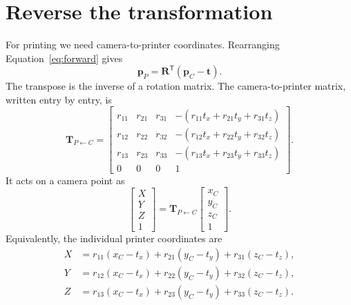\documentclass[11pt,letterpaper]{article}
\newcommand{\p}{\mathbf p}
\newcommand{\R}{\mathbf R}
\newcommand{\T}{\mathbf T}
\newcommand{\tr}{\mathbf t}
\newcommand{\tp}{\mathsf T}
\begin{document}
\section{Reverse the transformation}
For printing we need camera-to-printer coordinates. Rearranging
Equation~\eqref{eq:forward} gives
\begin{equation}
 \boxed{\p_P=\R^\tp(\p_C-\tr).}
 \label{eq:inverse}
\end{equation}
The transpose is the inverse of a rotation matrix. The camera-to-printer
matrix, written entry by entry, is
\begin{equation}
 \boxed{\T_{P\leftarrow C}=
 \begin{bmatrix}
 r_{11}&r_{21}&r_{31}&-(r_{11}t_x+r_{21}t_y+r_{31}t_z)\\
 r_{12}&r_{22}&r_{32}&-(r_{12}t_x+r_{22}t_y+r_{32}t_z)\\
 r_{13}&r_{23}&r_{33}&-(r_{13}t_x+r_{23}t_y+r_{33}t_z)\\
 0&0&0&1
 \end{bmatrix}.}
 \label{eq:matrix}
\end{equation}
It acts on a camera point as
\begin{equation}
 \begin{bmatrix}X\\Y\\Z\\1\end{bmatrix}
 =\T_{P\leftarrow C}\begin{bmatrix}x_C\\y_C\\z_C\\1\end{bmatrix}.
\end{equation}
Equivalently, the individual printer coordinates are
\begin{equation}
 \boxed{\begin{aligned}
 X&=r_{11}(x_C-t_x)+r_{21}(y_C-t_y)+r_{31}(z_C-t_z),\\
 Y&=r_{12}(x_C-t_x)+r_{22}(y_C-t_y)+r_{32}(z_C-t_z),\\
 Z&=r_{13}(x_C-t_x)+r_{23}(y_C-t_y)+r_{33}(z_C-t_z).
 \end{aligned}}
 \label{eq:inverse-components}
\end{equation}

\newpage
\end{document}
